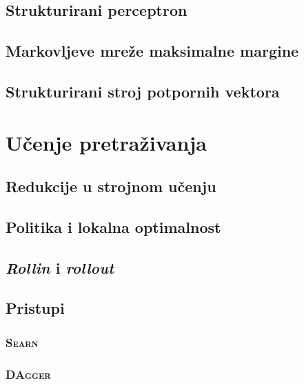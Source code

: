 \documentclass[times, utf8, diplomski]{fer}
\begin{document}
\section{Strukturirani perceptron}


\section{Markovljeve mreže maksimalne margine}


\section{Strukturirani stroj potpornih vektora}

\chapter{Učenje pretraživanja}\label{ch:l2s}


\section{Redukcije u strojnom učenju}\label{ch:reductions}


\section{Politika i lokalna optimalnost}\label{ch:politikailocalopt}


\section{\emph{Rollin} i \emph{rollout}}\label{ch:rollinrollout}


\section{Pristupi}\label{ch:metodesearchlearn}

\subsection{\textsc{Searn}}


\subsection{\textsc{DAgger}}

\end{document}
